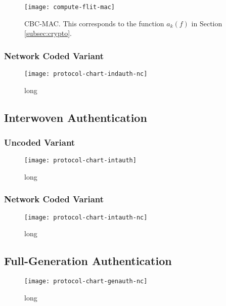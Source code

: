\begin{figure}
    \centering
    \texttt{[image: compute-flit-mac]}
    \caption[short]{CBC-MAC. This corresponds to the function $a_k(f)$ in Section \ref{subsec:crypto}.}%
    \label{fig:computeflitmac}
\end{figure}

\subsubsection{Network Coded Variant}
\begin{figure}
    \centering
    \texttt{[image: protocol-chart-indauth-nc]}
    \caption[short]{long}
    \label{fig:protchartindauthnc}
\end{figure}

\subsection{Interwoven Authentication}
\subsubsection{Uncoded Variant}
\begin{figure}
    \centering
    \texttt{[image: protocol-chart-intauth]}
    \caption[short]{long}
    \label{fig:protchartintauth}
\end{figure}

\subsubsection{Network Coded Variant}
\begin{figure}
    \centering
    \texttt{[image: protocol-chart-intauth-nc]}
    \caption[short]{long}
    \label{fig:protchartintauthnc}
\end{figure}

\subsection{Full-Generation Authentication}
\begin{figure}
    \centering
    \texttt{[image: protocol-chart-genauth-nc]}
    \caption[short]{long}
    \label{fig:protchartgenauthnc}
\end{figure}


